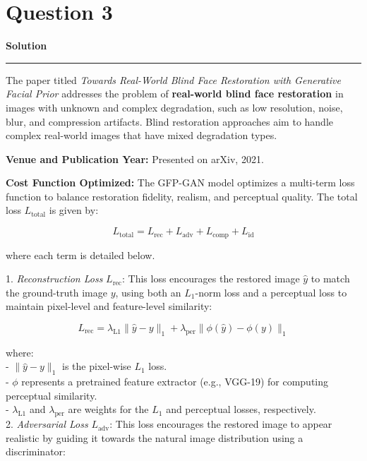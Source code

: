 \documentclass[a4paper,12pt]{article}
\title{\cooltitle{CS663 Assignment-5}}
\author{{\bf Saksham Rathi, Kavya Gupta, Shravan Srinivasa Raghavan} \\
\small Department of Computer Science, \\
Indian Institute of Technology Bombay \\}
\date{}
\newenvironment{solution}[2][]{%
    \begin{mdframed}[linecolor=blue!70!black, linewidth=2pt, roundcorner=10pt, backgroundcolor=yellow!10!white, skipabove=12pt, skipbelow=12pt]%
        \textbf{\large #2}
        \par\noindent\rule{\textwidth}{0.4pt}
}{
    \end{mdframed}
}
\begin{document}
\maketitle

\section*{Question 3}
\begin{solution}{Solution}
	The paper titled \textit{Towards Real-World Blind Face Restoration with Generative Facial Prior} addresses the problem of \textbf{real-world blind face restoration} in images with unknown and complex degradation, such as low resolution, noise, blur, and compression artifacts. Blind restoration approaches aim to handle complex real-world images that have mixed degradation types.

\textbf{Venue and Publication Year:} Presented on arXiv, 2021.

\textbf{Cost Function Optimized:} The GFP-GAN model optimizes a multi-term loss function to balance restoration fidelity, realism, and perceptual quality. The total loss \( L_{\text{total}} \) is given by:

\[
L_{\text{total}} = L_{\text{rec}} + L_{\text{adv}} + L_{\text{comp}} + L_{\text{id}}
\]

where each term is detailed below.

1. \textit{Reconstruction Loss} \( L_{\text{rec}} \): This loss encourages the restored image \( \hat{y} \) to match the ground-truth image \( y \), using both an \( L_1 \)-norm loss and a perceptual loss to maintain pixel-level and feature-level similarity:

   \[
   L_{\text{rec}} = \lambda_{\text{L1}} \| \hat{y} - y \|_1 + \lambda_{\text{per}} \| \phi(\hat{y}) - \phi(y) \|_1
   \]

   where: \\
   - \( \| \hat{y} - y \|_1 \) is the pixel-wise \( L_1 \) loss. \\
   - \( \phi \) represents a pretrained feature extractor (e.g., VGG-19) for computing perceptual similarity. \\
   - \( \lambda_{\text{L1}} \) and \( \lambda_{\text{per}} \) are weights for the \( L_1 \) and perceptual losses, respectively. \\

2. \textit{Adversarial Loss} \( L_{\text{adv}} \): This loss encourages the restored image to appear realistic by guiding it towards the natural image distribution using a discriminator:


\end{solution}
\end{document}
